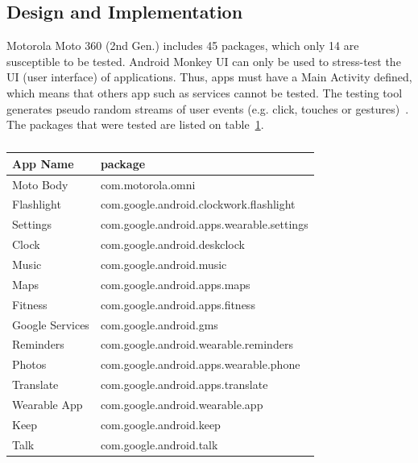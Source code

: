 \documentclass[11pt, draftclsnofoot, onecolumn]{IEEEtran}
\begin{document}
   
    \subsection{Design and Implementation} \label{subsec:SoftwareDesignImple} %
    Motorola Moto 360 (2nd Gen.) includes 45 packages, which only 14 are susceptible to be tested. Android Monkey UI can only be used to stress-test the UI (user interface) of applications. Thus, apps must have a Main Activity defined, which means that others app such as services cannot be tested. The testing tool generates pseudo random streams of user events (e.g. click, touches or gestures)~\cite{AndroidUITester}. The packages that were tested are listed on table~\ref{table:FuzzPackage}.
    
    \begin{table}[ht]
	\centering
        \caption{}
		\label{table:FuzzPackage}
		\begin{tabular}{ |l|l| }
			\hline
				App Name         & package \\
			\hline
				Moto Body        & com.motorola.omni \\
				Flashlight       & com.google.android.clockwork.flashlight \\
				Settings         & com.google.android.apps.wearable.settings \\
				Clock            & com.google.android.deskclock \\
				Music            & com.google.android.music \\
				Maps             & com.google.android.apps.maps \\
				Fitness          & com.google.android.apps.fitness \\
				Google Services  & com.google.android.gms \\
				Reminders        & com.google.android.wearable.reminders \\
				Photos           & com.google.android.apps.wearable.phone \\
				Translate        & com.google.android.apps.translate \\
				Wearable App     & com.google.android.wearable.app \\
				Keep             & com.google.android.keep \\
				Talk             & com.google.android.talk \\
			\hline
		\end{tabular}
	\end{table}	
\end{document}
